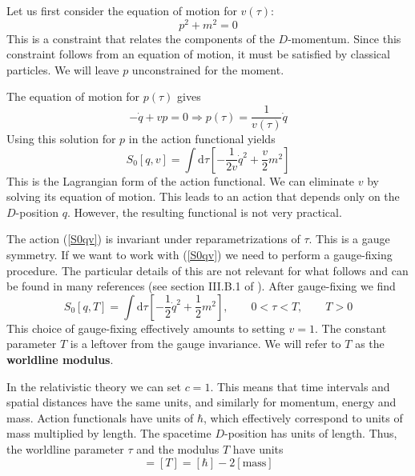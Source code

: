 Let us first consider the equation of motion for $v(\tau)$:
\begin{equation}
	p^{2} + m^{2} = 0
\end{equation}
This is a constraint that relates the components of the $D$-momentum. Since this constraint follows from an equation of motion, it must be satisfied by classical particles. We will leave $p$ unconstrained for the moment.

The equation of motion for $p(\tau)$ gives
\begin{equation}
	{- \dot{q} } + v p = 0 \Longrightarrow p(\tau) = \frac{1}{v(\tau)} \dot{q}
\end{equation}
Using this solution for $p$ in the action functional yields
\begin{equation}
	S_{0}[q, v] = \int \mathrm{d}\tau \left[ - \frac{1}{2v} \dot{q}^{2} + \frac{v}{2} m^{2} \right] \label{S0qv}
\end{equation}
This is the Lagrangian form of the action functional. We can eliminate $v$ by solving its equation of motion. This leads to an action that depends only on the $D$-position $q$. However, the resulting functional is not very practical.

The action (\ref{S0qv}) is invariant under reparametrizations of $\tau$. This is a gauge symmetry. If we want to work with (\ref{S0qv}) we need to perform a gauge-fixing procedure. The particular details of this are not relevant for what follows and can be found in many references (see section III.B.1 of \cite{Fields}). After gauge-fixing we find
\begin{equation}
	S_{0}[q, T] = \int \mathrm{d}\tau \left[ - \frac{1}{2} \dot{q}^{2} + \frac{1}{2}m^{2} \right], \qquad 0 < \tau < T, \qquad T > 0 \label{GaugeFixedParticle}
\end{equation}
This choice of gauge-fixing effectively amounts to setting $v = 1$. The constant parameter $T$ is a leftover from the gauge invariance. We will refer to $T$ as the \textbf{worldline modulus}.

In the relativistic theory we can set $c = 1$. This means that time intervals and spatial distances have the same units, and similarly for momentum, energy and mass. Action functionals have units of $\hbar$, which effectively correspond to units of mass multiplied by length. The spacetime $D$-position has units of length. Thus, the worldline parameter $\tau$ and the modulus $T$ have units
\begin{equation}
	[\tau] = [T] = [\hbar] - 2 [\text{mass}]
\end{equation}


